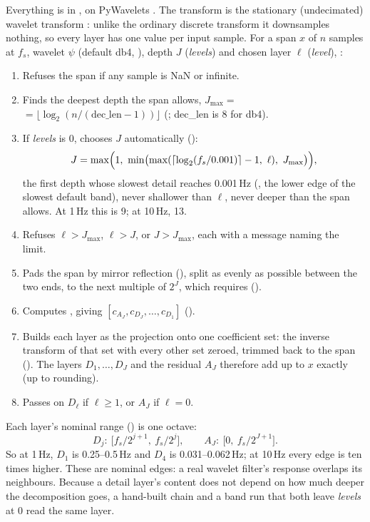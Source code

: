Everything is in , on PyWavelets
\citep{lee2019pywavelets}. The transform is the stationary (undecimated) wavelet transform
\citep{nason1995stationary}: unlike the ordinary discrete transform it downsamples nothing, so
every layer has one value per input sample. For a span $x$ of $n$ samples at $f_s$, wavelet
$\psi$ (default db4, \citealp{daubechies1992ten}), depth $J$ (\emph{levels}) and chosen layer
$\ell$ (\emph{level}), :
\begin{enumerate}
\item Refuses the span if any sample is NaN or infinite.
\item Finds the deepest depth the span allows, $J_{\max} =$  $= \lfloor\log_2(n/(\mathrm{dec\_len}-1))\rfloor$ (; dec\_len is
  8 for db4).
\item If \emph{levels} is 0, chooses $J$ automatically ():
  \[ J = \max\Bigl(1,\ \min\bigl(\max(\lceil\log_2(f_s/0.001)\rceil - 1,\ \ell),\ J_{\max}\bigr)\Bigr), \]
  the first depth whose slowest detail reaches 0.001\,Hz (, the lower edge of the
  slowest default band), never shallower than $\ell$, never deeper than the span allows. At
  1\,Hz this is 9; at 10\,Hz, 13.
\item Refuses $\ell > J_{\max}$, $\ell > J$, or $J > J_{\max}$, each with a message naming the
  limit.
\item Pads the span by mirror reflection (), split as evenly as
  possible between the two ends, to the next multiple of $2^J$, which  requires
  ().
\item Computes , giving
  $[c_{A_J}, c_{D_J}, \dots, c_{D_1}]$ ().
\item Builds each layer as the projection onto one coefficient set: the inverse transform
   of that set with every other set zeroed, trimmed back to the span
  (). The layers $D_1,\dots,D_J$ and the residual $A_J$ therefore add up to
  $x$ exactly (up to rounding).
\item Passes on $D_\ell$ if $\ell \geq 1$, or $A_J$ if $\ell = 0$.
\end{enumerate}
Each layer's nominal range () is one octave:
\[ D_j:\ \bigl[f_s/2^{j+1},\ f_s/2^{j}\bigr], \qquad A_J:\ \bigl[0,\ f_s/2^{J+1}\bigr]. \]
So at 1\,Hz, $D_1$ is 0.25--0.5\,Hz and $D_4$ is 0.031--0.062\,Hz; at 10\,Hz every edge is ten
times higher. These are nominal edges: a real wavelet filter's response overlaps its
neighbours. Because a detail layer's content does not depend on how much deeper the
decomposition goes, a hand-built chain and a band run that both leave \emph{levels} at 0 read
the same layer.

